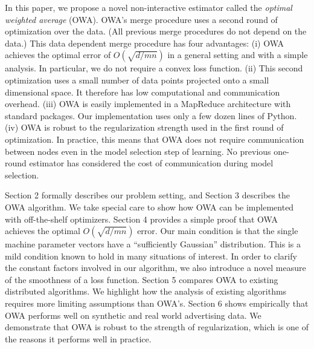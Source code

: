 \documentclass[thesis.tex]{subfiles}
\begin{document}
In this paper, we propose a novel non-interactive estimator called the \emph{optimal weighted average} (OWA).
OWA's merge procedure uses a second round of optimization over the data.
(All previous merge procedures do not depend on the data.)
This data dependent merge procedure has four advantages:
(i) OWA achieves the optimal error of $O(\sqrt{d/mn})$ in a general setting and with a simple analysis.
In particular, we do not require a convex loss function.
(ii) This second optimization uses a small number of data points projected onto a small dimensional space. 
It therefore has low computational and communication overhead.
(iii) OWA is easily implemented in a MapReduce architecture with standard packages.
Our implementation uses only a few dozen lines of Python.
(iv) OWA is robust to the regularization strength used in the first round of optimization.
In practice, this means that OWA does not require communication between nodes even in the model selection step of learning.
No previous one-round estimator has considered the cost of communication during model selection.

Section 2 formally describes our problem setting, and
Section 3 describes the OWA algorithm.
We take special care to show how OWA can be implemented with off-the-shelf optimizers.
Section 4 provides a simple proof that OWA achieves the optimal $O(\sqrt{d/mn})$ error. %
Our main condition is that the single machine parameter vectors have a ``sufficiently Gaussian'' distribution.
This is a mild condition known to hold in many situations of interest.
In order to clarify the constant factors involved in our algorithm,
we also introduce a novel measure of the smoothness of a loss function.
Section 5 compares OWA to existing distributed algorithms.
We highlight how the analysis of existing algorithms requires more limiting assumptions than OWA's.
Section 6 shows empirically that OWA performs well on synthetic and real world advertising data.
We demonstrate that OWA is robust to the strength of regularization,
which is one of the reasons it performs well in practice.
\end{document}

